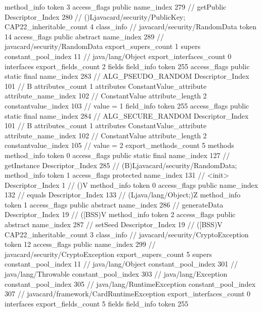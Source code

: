 {{{{{				}
				method_info {
					token	3
					access_flags	public
					name_index	279		// getPublic
					Descriptor_Index	280		// ()Ljavacard/security/PublicKey;
				}
			}
			CAP22_inheritable_count	4
		}
		class_info {		// javacard/security/RandomData
			token	14
			access_flags	public abstract
			name_index	289		// javacard/security/RandomData
			export_supers_count	1
			supers {
				constant_pool_index	11		// java/lang/Object
			}
			export_interfaces_count	0
			interfaces {
			}
			export_fields_count	2
			fields {
			field_info {
				token	255
				access_flags	public static final
				name_index	283		// ALG_PSEUDO_RANDOM
				Descriptor_Index	101		// B
				attributes_count	1
				attributes {
				ConstantValue_attribute {
					attribute_name_index	102		// ConstantValue
					attribute_length	2
					constantvalue_index	103		// value = 1
				}
				}
			}
			field_info {
				token	255
				access_flags	public static final
				name_index	284		// ALG_SECURE_RANDOM
				Descriptor_Index	101		// B
				attributes_count	1
				attributes {
				ConstantValue_attribute {
					attribute_name_index	102		// ConstantValue
					attribute_length	2
					constantvalue_index	105		// value = 2
				}
				}
			}
			}
			export_methods_count	5
			methods {
				method_info {
					token	0
					access_flags	public static final
					name_index	127		// getInstance
					Descriptor_Index	285		// (B)Ljavacard/security/RandomData;
				}
				method_info {
					token	1
					access_flags	protected
					name_index	131		// <init>
					Descriptor_Index	1		// ()V
				}
				method_info {
					token	0
					access_flags	public
					name_index	132		// equals
					Descriptor_Index	133		// (Ljava/lang/Object;)Z
				}
				method_info {
					token	1
					access_flags	public abstract
					name_index	286		// generateData
					Descriptor_Index	19		// ([BSS)V
				}
				method_info {
					token	2
					access_flags	public abstract
					name_index	287		// setSeed
					Descriptor_Index	19		// ([BSS)V
				}
			}
			CAP22_inheritable_count	3
		}
		class_info {		// javacard/security/CryptoException
			token	12
			access_flags	public
			name_index	299		// javacard/security/CryptoException
			export_supers_count	5
			supers {
				constant_pool_index	11		// java/lang/Object
				constant_pool_index	301		// java/lang/Throwable
				constant_pool_index	303		// java/lang/Exception
				constant_pool_index	305		// java/lang/RuntimeException
				constant_pool_index	307		// javacard/framework/CardRuntimeException
			}
			export_interfaces_count	0
			interfaces {
			}
			export_fields_count	5
			fields {
			field_info {
				token	255
}}}}}
